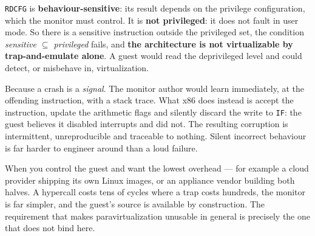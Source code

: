 \begin{ans}
  \item \texttt{RDCFG} is \textbf{behaviour-sensitive}: its result depends on
        the privilege configuration, which the monitor must control. It is
        \textbf{not privileged}: it does not fault in user mode. So there is a
        sensitive instruction outside the privileged set, the condition
        \emph{sensitive $\subseteq$ privileged} fails, and \textbf{the
        architecture is not virtualizable by trap-and-emulate alone}. A guest
        would read the deprivileged level and could detect, or misbehave in,
        virtualization.
  \item Because a crash is a \emph{signal}. The monitor author would learn
        immediately, at the offending instruction, with a stack trace. What x86
        does instead is accept the instruction, update the arithmetic flags and
        silently discard the write to \texttt{IF}: the guest believes it
        disabled interrupts and did not. The resulting corruption is
        intermittent, unreproducible and traceable to nothing. Silent incorrect
        behaviour is far harder to engineer around than a loud failure.
  \item When you control the guest and want the lowest overhead --- for example
        a cloud provider shipping its own Linux images, or an appliance vendor
        building both halves. A hypercall costs tens of cycles where a trap
        costs hundreds, the monitor is far simpler, and the guest's source is
        available by construction. The requirement that makes paravirtualization
        unusable in general is precisely the one that does not bind here.
\end{ans}

